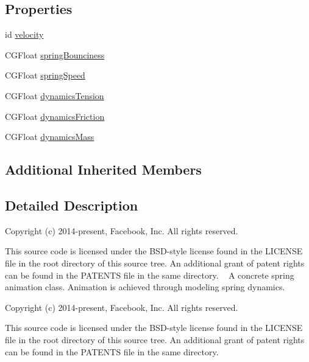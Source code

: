 \subsection*{Properties}
\begin{DoxyCompactItemize}
\item 
id \mbox{\hyperlink{interface_p_o_p_spring_animation_ad413eacea836237501a69880c6e85906}{velocity}}
\item 
C\+G\+Float \mbox{\hyperlink{interface_p_o_p_spring_animation_aad2f942dd74dae8972192b09fad6d8fa}{spring\+Bounciness}}
\item 
C\+G\+Float \mbox{\hyperlink{interface_p_o_p_spring_animation_a8a03552461b8d51fe95fec396643a882}{spring\+Speed}}
\item 
C\+G\+Float \mbox{\hyperlink{interface_p_o_p_spring_animation_a0cf9c83f313b13dc58a038b9f9dd18c5}{dynamics\+Tension}}
\item 
C\+G\+Float \mbox{\hyperlink{interface_p_o_p_spring_animation_ac7063d5cd3fb307acfa6e9e71df910df}{dynamics\+Friction}}
\item 
C\+G\+Float \mbox{\hyperlink{interface_p_o_p_spring_animation_a87fc29931727e0a5b320c4690f8a56c1}{dynamics\+Mass}}
\end{DoxyCompactItemize}
\subsection*{Additional Inherited Members}


\subsection{Detailed Description}
Copyright (c) 2014-\/present, Facebook, Inc. All rights reserved.

This source code is licensed under the B\+S\+D-\/style license found in the L\+I\+C\+E\+N\+SE file in the root directory of this source tree. An additional grant of patent rights can be found in the P\+A\+T\+E\+N\+TS file in the same directory. ~\newline
 A concrete spring animation class.  Animation is achieved through modeling spring dynamics.

Copyright (c) 2014-\/present, Facebook, Inc. All rights reserved.

This source code is licensed under the B\+S\+D-\/style license found in the L\+I\+C\+E\+N\+SE file in the root directory of this source tree. An additional grant of patent rights can be found in the P\+A\+T\+E\+N\+TS file in the same directory. 

